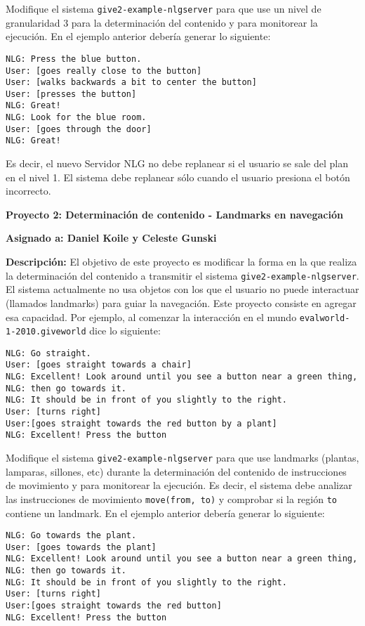 \documentclass{article}
\begin{document}
Modifique el sistema \texttt{give2-example-nlgserver} para que use un nivel de granularidad 3 para la determinaci\'on del contenido y para monitorear la ejecuci\'on. En el ejemplo anterior deber\'ia generar lo siguiente:

\begin{verbatim}
NLG: Press the blue button.
User: [goes really close to the button]
User: [walks backwards a bit to center the button]
User: [presses the button]
NLG: Great! 
NLG: Look for the blue room.
User: [goes through the door]
NLG: Great! 
\end{verbatim}

Es decir, el nuevo Servidor NLG no debe replanear si el usuario se sale del plan en el nivel 1. El sistema debe replanear s\'olo cuando el usuario presiona el bot\'on incorrecto. 

\bigskip
\noindent
\textbf{Proyecto 2: Determinaci\'on de contenido - Landmarks en navegaci\'on} 

\textbf{Asignado a: Daniel Koile y Celeste Gunski} 

\textbf{Descripci\'on:} El objetivo de este proyecto es modificar la forma en la que realiza la determinaci\'on del contenido a transmitir el sistema \texttt{give2-example-nlgserver}. El sistema actualmente no usa objetos con los que el usuario no puede interactuar (llamados landmarks) para guiar la navegaci\'on. Este proyecto consiste en agregar esa capacidad. Por ejemplo, al comenzar la interacci\'on en el mundo \texttt{evalworld-1-2010.giveworld} dice lo siguiente: 

\begin{verbatim}
NLG: Go straight. 
User: [goes straight towards a chair]
NLG: Excellent! Look around until you see a button near a green thing,
NLG: then go towards it. 
NLG: It should be in front of you slightly to the right. 
User: [turns right]
User:[goes straight towards the red button by a plant]
NLG: Excellent! Press the button
\end{verbatim}

Modifique el sistema \texttt{give2-example-nlgserver} para que use landmarks (plantas, lamparas, sillones, etc) durante la determinaci\'on del contenido de instrucciones de movimiento y para monitorear la ejecuci\'on. Es decir, el sistema debe analizar las instrucciones de movimiento \texttt{move(from, to)} y comprobar si la regi\'on \texttt{to} contiene un landmark. En el ejemplo anterior deber\'ia generar lo siguiente:

\begin{verbatim}
NLG: Go towards the plant. 
User: [goes towards the plant]
NLG: Excellent! Look around until you see a button near a green thing, 
NLG: then go towards it. 
NLG: It should be in front of you slightly to the right. 
User: [turns right]
User:[goes straight towards the red button]
NLG: Excellent! Press the button
\end{verbatim}
\end{document}
